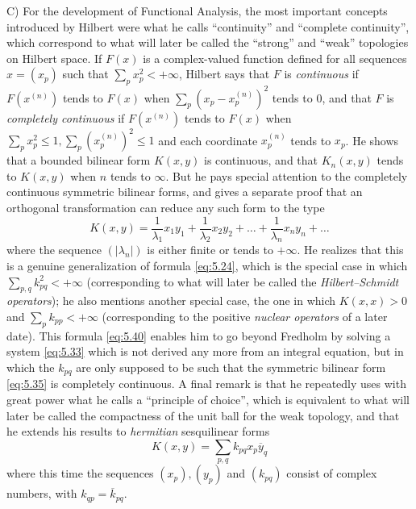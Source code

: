 \documentclass[12pt,a4paper,leqno,twoside]{extbook}
\begin{document}
C) For the development of Functional Analysis, the most important concepts introduced by Hilbert were what he calls ``continuity'' and ``complete continuity'', which correspond to what will later be called the ``strong'' and ``weak'' topologies on Hilbert space. If \(F(x)\) is a complex-valued function defined for all sequences \(x = (x_p)\) such that \(\sum\limits_p x_p^2 < +\infty\), Hilbert says that \(F\) is \emph{continuous} if \(F\left(x^{(n)}\right)\) tends to \(F(x)\) when \(\sum\limits_p \left(x_p - x_p^{(n)}\right)^2\) tends to 0, and that \(F\) is \emph{completely continuous} if \(F\left(x^{(n)}\right)\) tends to \(F(x)\) when \(\sum\limits_p x_p^2 \leq 1, \sum\limits_p \left(x_p^{(n)}\right)^2 \leq 1\) and each coordinate \(x_p^{(n)}\) tends to \(x_p\). He shows that a bounded bilinear form \(K(x,y)\) is continuous, and that \(K_n(x,y)\) tends to \(K(x,y)\) when \(n\) tends to \(\infty\). But he pays special attention to the completely continuous symmetric bilinear forms, and gives a separate proof that an orthogonal transformation can reduce any such form to the type
\begin{equation}
    \label{eq:5.40}
    K(x,y) = \frac{1}{\lambda_1} x_1 y_1 +\frac{1}{\lambda_2} x_2 y_2 + \ldots + \frac{1}{\lambda_n} x_n y_n + \ldots
\end{equation}
where the sequence \((|\lambda_n|)\) is either finite or tends to \(+\infty\). He realizes that this is a genuine generalization of formula \eqref{eq:5.24}, which is the special case in which \(\sum\limits_{p,q} k_{pq}^2 < +\infty\) (corresponding to what will later be called the \emph{Hilbert--Schmidt operators}); he also mentions another special case, the one in which \(K(x,x) > 0\) and \(\sum\limits_p k_{pp} < +\infty\) (corresponding to the positive \emph{nuclear operators} of a later date). This formula \eqref{eq:5.40} enables him to go beyond Fredholm by solving a system \eqref{eq:5.33} which is not derived any more from an integral equation, but in which the \(k_{pq}\) are only supposed to be such that the symmetric bilinear form \eqref{eq:5.35} is completely continuous. A final remark is that he repeatedly uses with great power what he calls a ``principle of choice'', which is equivalent to what will later be called the compactness of the unit ball for the weak topology, and that he extends his results to \emph{hermitian} sesquilinear forms
\begin{equation}
    \label{eq:5.41}
    K(x,y) = \sum_{p,q} k_{pq} x_p \overline{y}_q
\end{equation}
where this time the sequences \((x_p), (y_p)\) and \((k_{pq})\) consist of complex numbers, with \(k_{qp} = \overline{k}_{pq}\).
\end{document}
